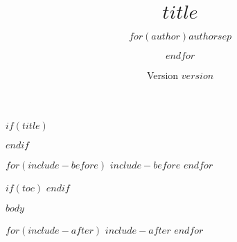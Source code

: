 \documentclass[$if(fontsize)$$fontsize$,$endif$%
               $if(lang)$$lang$,$endif$%
               DIV=13]{scrreprt}
\title{$title$}
\author{$for(author)$$author$$sep$ \and $endfor$}
\date{Version $version$}
\begin{document}
$if(title)$
\maketitle
$endif$

$for(include-before)$
$include-before$
$endfor$

$if(toc)$
\tableofcontents
$endif$

$body$

$for(include-after)$
$include-after$
$endfor$
\end{document}
